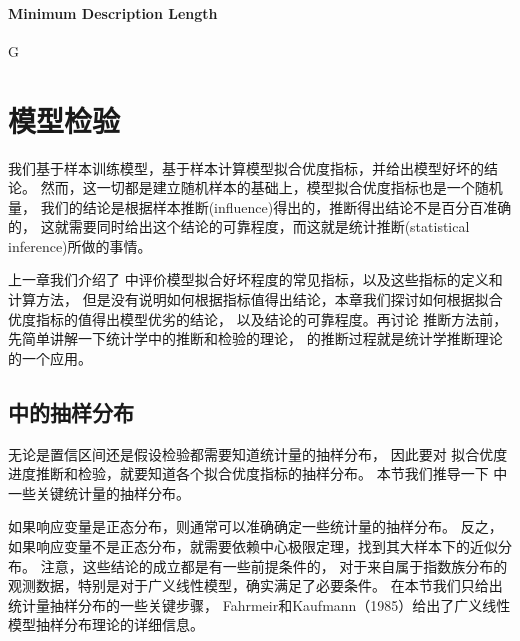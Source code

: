 \documentclass[letterpaper,10pt,english]{sphinxmanual}
\begin{document}
\begin{figure}[htbp]
\centering

\noindent{}
\end{figure}


\subsubsection{Minimum Description Length}
\label{\detokenize{_u6a21_u578b_u8bc4_u4f30/content:minimum-description-length}}

G


\chapter{模型检验}
\label{\detokenize{_u6a21_u578b_u8bc4_u4f30/influence:id1}}\label{\detokenize{_u6a21_u578b_u8bc4_u4f30/influence::doc}}
我们基于样本训练模型，基于样本计算模型拟合优度指标，并给出模型好坏的结论。
然而，这一切都是建立随机样本的基础上，模型拟合优度指标也是一个随机量，
我们的结论是根据样本推断(influence)得出的，推断得出结论不是百分百准确的，
这就需要同时给出这个结论的可靠程度，而这就是统计推断(statistical inference)所做的事情。

上一章我们介绍了  中评价模型拟合好坏程度的常见指标，以及这些指标的定义和计算方法，
但是没有说明如何根据指标值得出结论，本章我们探讨如何根据拟合优度指标的值得出模型优劣的结论，
以及结论的可靠程度。再讨论  推断方法前，先简单讲解一下统计学中的推断和检验的理论，
 的推断过程就是统计学推断理论的一个应用。


\section{ 中的抽样分布}
\label{\detokenize{_u6a21_u578b_u8bc4_u4f30/influence:glm}}
无论是置信区间还是假设检验都需要知道统计量的抽样分布，
因此要对  拟合优度进度推断和检验，就要知道各个拟合优度指标的抽样分布。
本节我们推导一下  中一些关键统计量的抽样分布。

如果响应变量是正态分布，则通常可以准确确定一些统计量的抽样分布。
反之，如果响应变量不是正态分布，就需要依赖中心极限定理，找到其大样本下的近似分布。
注意，这些结论的成立都是有一些前提条件的，
对于来自属于指数族分布的观测数据，特别是对于广义线性模型，确实满足了必要条件。
在本节我们只给出统计量抽样分布的一些关键步骤，
Fahrmeir和Kaufmann（1985）给出了广义线性模型抽样分布理论的详细信息。
\end{document}
